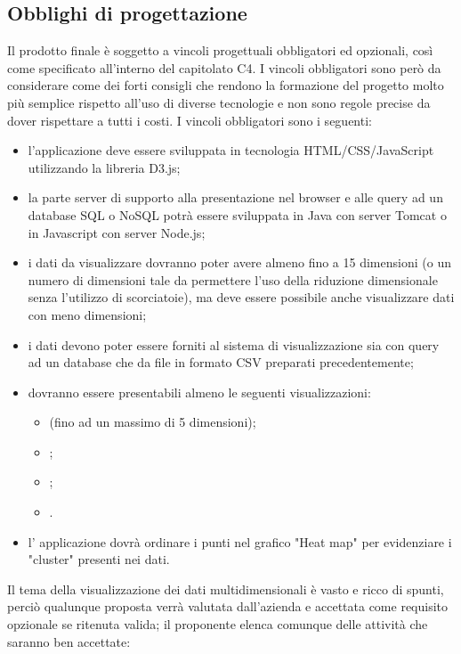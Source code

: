 \subsection{Obblighi di progettazione}
Il prodotto finale è soggetto a vincoli progettuali obbligatori ed opzionali, così come specificato all’interno del capitolato C4. I vincoli obbligatori sono però da considerare come dei forti consigli che rendono la formazione del progetto molto più semplice rispetto all'uso di diverse tecnologie e non sono regole precise da dover rispettare a tutti i costi.
I vincoli obbligatori sono i seguenti:
\begin{itemize}
	\item l'applicazione deve essere sviluppata in tecnologia HTML/CSS/JavaScript utilizzando la libreria D3.js;
	\item la parte server di supporto alla presentazione nel browser e alle query ad un database SQL o NoSQL
potrà essere sviluppata in Java con server Tomcat o in Javascript con server Node.js;
	\item i dati da visualizzare dovranno poter avere almeno fino a 15 dimensioni (o un numero di dimensioni tale da permettere l'uso della riduzione dimensionale senza l'utilizzo di scorciatoie), ma deve essere possibile anche visualizzare dati con meno dimensioni;
	\item i dati devono poter essere forniti al sistema di visualizzazione sia con query ad un database che da file in formato CSV preparati precedentemente;
	\item dovranno essere presentabili almeno le seguenti visualizzazioni:
	\begin{itemize}
		\item {} (fino ad un massimo di 5 dimensioni);
		\item {};
		\item {};
		\item {}.
	\end{itemize}
	\item l' applicazione dovrà ordinare i punti nel grafico "Heat map" per evidenziare i "cluster" presenti nei dati.
\end{itemize}
Il tema della visualizzazione dei dati multidimensionali è vasto e ricco di spunti, perciò qualunque proposta verrà valutata dall'azienda e accettata come requisito opzionale se ritenuta valida; il proponente elenca comunque delle attività che saranno ben accettate:
